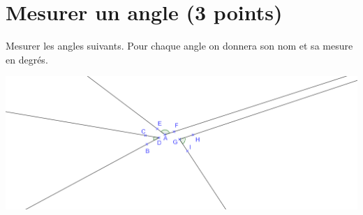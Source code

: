 \section{Mesurer un angle (3 points)}

\begin{questions}
	\question Mesurer les angles suivants. Pour chaque angle on donnera son nom et sa mesure en degrés.
	
	\begin{center}
		\includegraphics[scale=0.11]{img/mesures2}
	\end{center}
\end{questions}
